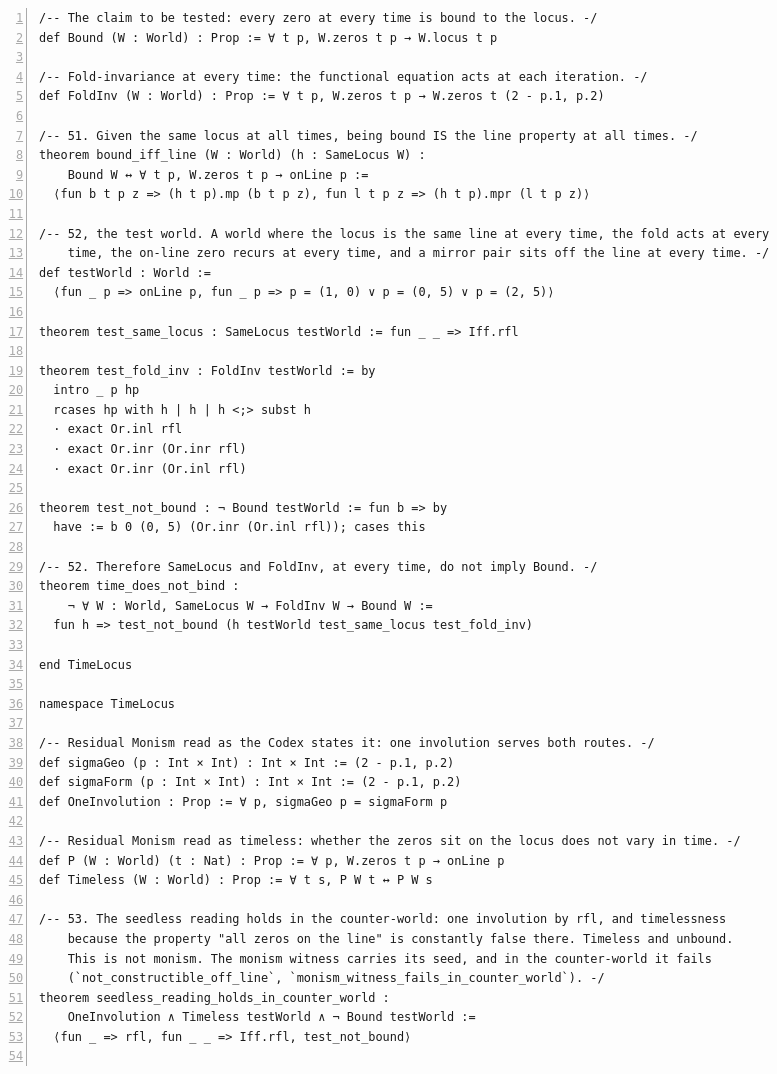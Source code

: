 \documentclass[10pt]{article}
\newcommand{\leansize}{\fontsize{5.5pt}{6.75pt}\selectfont}
\begin{document}
\begin{multicols}{2}
\begin{Verbatim}[numbers=left,firstnumber=1,numbersep=3pt,xleftmargin=2.6em,breaklines=true,breakanywhere=true,breakautoindent=false,breakindent=1.4em,breaksymbolleft={},breakanywheresymbolpre={},fontsize=\leansize]
/-- The claim to be tested: every zero at every time is bound to the locus. -/
def Bound (W : World) : Prop := ∀ t p, W.zeros t p → W.locus t p

/-- Fold-invariance at every time: the functional equation acts at each iteration. -/
def FoldInv (W : World) : Prop := ∀ t p, W.zeros t p → W.zeros t (2 - p.1, p.2)

/-- 51. Given the same locus at all times, being bound IS the line property at all times. -/
theorem bound_iff_line (W : World) (h : SameLocus W) :
    Bound W ↔ ∀ t p, W.zeros t p → onLine p :=
  ⟨fun b t p z => (h t p).mp (b t p z), fun l t p z => (h t p).mpr (l t p z)⟩

/-- 52, the test world. A world where the locus is the same line at every time, the fold acts at every
    time, the on-line zero recurs at every time, and a mirror pair sits off the line at every time. -/
def testWorld : World :=
  ⟨fun _ p => onLine p, fun _ p => p = (1, 0) ∨ p = (0, 5) ∨ p = (2, 5)⟩

theorem test_same_locus : SameLocus testWorld := fun _ _ => Iff.rfl

theorem test_fold_inv : FoldInv testWorld := by
  intro _ p hp
  rcases hp with h | h | h <;> subst h
  · exact Or.inl rfl
  · exact Or.inr (Or.inr rfl)
  · exact Or.inr (Or.inl rfl)

theorem test_not_bound : ¬ Bound testWorld := fun b => by
  have := b 0 (0, 5) (Or.inr (Or.inl rfl)); cases this

/-- 52. Therefore SameLocus and FoldInv, at every time, do not imply Bound. -/
theorem time_does_not_bind :
    ¬ ∀ W : World, SameLocus W → FoldInv W → Bound W :=
  fun h => test_not_bound (h testWorld test_same_locus test_fold_inv)

end TimeLocus

namespace TimeLocus

/-- Residual Monism read as the Codex states it: one involution serves both routes. -/
def sigmaGeo (p : Int × Int) : Int × Int := (2 - p.1, p.2)
def sigmaForm (p : Int × Int) : Int × Int := (2 - p.1, p.2)
def OneInvolution : Prop := ∀ p, sigmaGeo p = sigmaForm p

/-- Residual Monism read as timeless: whether the zeros sit on the locus does not vary in time. -/
def P (W : World) (t : Nat) : Prop := ∀ p, W.zeros t p → onLine p
def Timeless (W : World) : Prop := ∀ t s, P W t ↔ P W s

/-- 53. The seedless reading holds in the counter-world: one involution by rfl, and timelessness
    because the property "all zeros on the line" is constantly false there. Timeless and unbound.
    This is not monism. The monism witness carries its seed, and in the counter-world it fails
    (`not_constructible_off_line`, `monism_witness_fails_in_counter_world`). -/
theorem seedless_reading_holds_in_counter_world :
    OneInvolution ∧ Timeless testWorld ∧ ¬ Bound testWorld :=
  ⟨fun _ => rfl, fun _ _ => Iff.rfl, test_not_bound⟩


\end{Verbatim}
\end{multicols}
\end{document}
